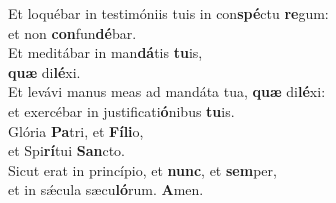 \evenverse Et loquébar in testimóniis tuis in con\textbf{spé}ctu \textbf{re}gum:~\*\\
\evenverse et non \textbf{con}fun\textbf{dé}bar.\\
\oddverse Et meditábar in man\textbf{dá}tis \textbf{tu}is,~\*\\
\oddverse \textbf{quæ} di\textbf{lé}xi.\\
\evenverse Et levávi manus meas ad mandáta tua, \textbf{quæ} di\textbf{lé}xi:~\*\\
\evenverse et exercébar in justificati\textbf{ó}nibus \textbf{tu}is.\\
\oddverse Glória \textbf{Pa}tri, et \textbf{Fí}\textbf{li}o,~\*\\
\oddverse et Spi\textbf{rí}tui \textbf{San}cto.\\
\evenverse Sicut erat in princípio, et \textbf{nunc}, et \textbf{sem}per,~\*\\
\evenverse et in sǽcula sæcu\textbf{ló}rum. \textbf{A}men.\\
